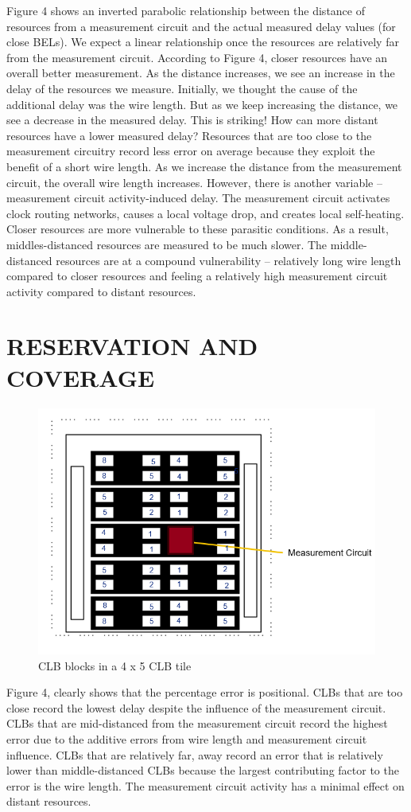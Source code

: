 \documentclass[11pt]{report}
\begin{document}
\begin{mainf}
Figure 4 shows an inverted parabolic relationship between the distance of resources from a measurement circuit and the actual measured delay values (for close BELs). We expect a linear relationship once the resources are relatively far from the measurement circuit. According to Figure 4, closer resources have an overall better measurement. As the distance increases, we see an increase in the delay of the resources we measure. Initially, we thought the cause of the additional delay was the wire length. But as we keep increasing the distance, we see a decrease in the measured delay. This is striking! How can more distant resources have a lower measured delay? Resources that are too close to the measurement circuitry record less error on average because they exploit the benefit of a short wire length. As we increase the distance from the measurement circuit, the overall wire length increases. However, there is another variable -- measurement circuit activity-induced delay. The measurement circuit activates clock routing networks, causes a local voltage drop, and creates local self-heating. Closer resources are more vulnerable to these parasitic conditions. As a result, middles-distanced resources are measured to be much slower. The middle-distanced resources are at a compound vulnerability -- relatively long wire length compared to closer resources and feeling a relatively high measurement circuit activity compared to distant resources.  

\newpage

\section{\textbf{RESERVATION AND COVERAGE}} 

\begin{figure}[H]
    \centering
    \includegraphics[width=0.5\linewidth]{clb_blocks.png}
    \caption{CLB blocks in a 4 x 5 CLB tile}
    \label{fig:enter-label}
\end{figure}


Figure 4, clearly shows that the percentage error is positional. CLBs that are too close record the lowest delay despite the influence of the measurement circuit. CLBs that are mid-distanced from the measurement circuit record the highest error due to the additive errors from wire length and measurement circuit influence. CLBs that are relatively far, away record an error that is relatively lower than middle-distanced CLBs because the largest contributing factor to the error is the wire length. The measurement circuit activity has a minimal effect on distant resources.


\end{mainf}
\end{document}
